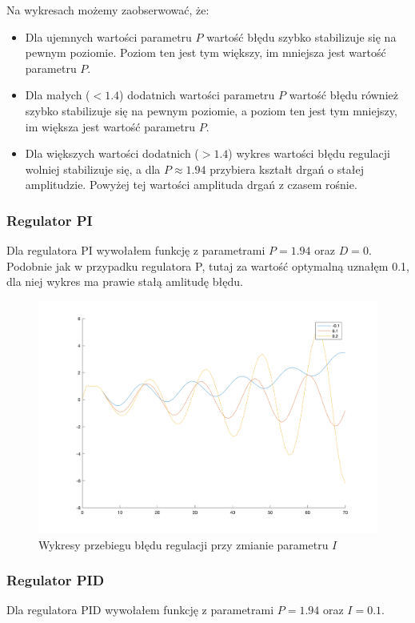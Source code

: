 \documentclass[a4paper,10pt]{article}
\begin{document}
Na wykresach możemy zaobserwować, że:
\begin{itemize}
	\item Dla ujemnych wartości parametru $P$ wartość błędu szybko stabilizuje się na pewnym poziomie. Poziom ten jest tym większy, im mniejsza jest wartość parametru $P$.
	\item Dla małych ($<1.4$) dodatnich wartości parametru $P$ wartość błędu również szybko stabilizuje się na pewnym poziomie, a poziom ten jest tym mniejszy, im większa jest wartość parametru $P$.
	\item Dla większych wartości dodatnich ($>1.4$) wykres wartości błędu regulacji wolniej stabilizuje się, a dla $P \approx 1.94$ przybiera kształt drgań o stałej amplitudzie. Powyżej tej wartości amplituda drgań z czasem rośnie.
\end{itemize}
\newpage


\subsubsection{Regulator PI}
Dla regulatora PI wywołałem funkcję z parametrami $P=1.94$ oraz $D=0$.
Podobnie jak  w przypadku regulatora P, tutaj za wartość optymalną uznałęm 0.1, dla niej wykres ma prawie stałą amlitudę błędu.


\begin{figure}[!h]
	\centering
	\includegraphics[width=120mm]{pi_1.png}
	\caption{Wykresy przebiegu błędu regulacji przy zmianie parametru $I$}
	\label{fig:symulacjaPI}
\end{figure}


\subsubsection{Regulator PID}
Dla regulatora PID wywołałem funkcję z parametrami $P=1.94$ oraz $I=0.1$.
\end{document}
